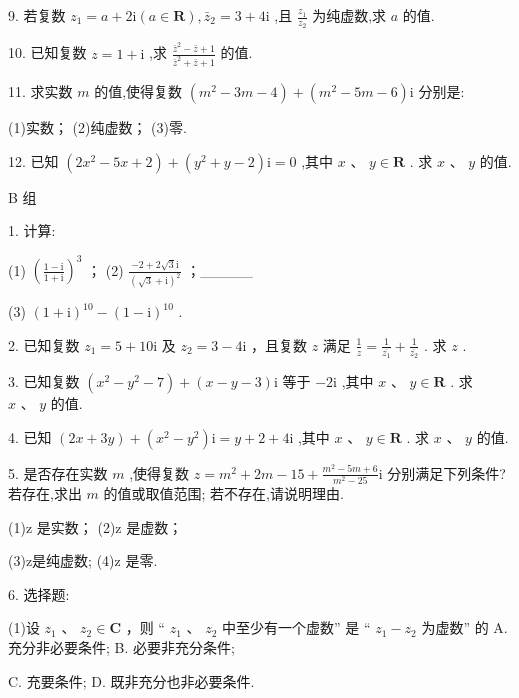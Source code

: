 \documentclass[10pt]{article}
\begin{document}
9. 若复数 \({z}_{1} = a + 2\mathrm{i}\left( {a \in  \mathbf{R}}\right) ,{\bar{z}}_{2} = 3 + 4\mathrm{i}\) ,且 \(\frac{{z}_{1}}{{z}_{2}}\) 为纯虚数,求 \(a\) 的值.

10. 已知复数 \(z = 1 + \mathrm{i}\) ,求 \(\frac{{\bar{z}}^{2} - \bar{z} + 1}{{\bar{z}}^{2} + \bar{z} + 1}\) 的值.

11. 求实数 \(m\) 的值,使得复数 \(\left( {{m}^{2} - {3m} - 4}\right)  + \left( {{m}^{2} - {5m} - 6}\right) \mathrm{i}\) 分别是:

(1)实数； (2)纯虚数； (3)零.

12. 已知 \(\left( {2{x}^{2} - {5x} + 2}\right)  + \left( {{y}^{2} + y - 2}\right) \mathrm{i} = 0\) ,其中 \(x\text{ 、 }y \in  \mathbf{R}\) . 求 \(x\text{ 、 }y\) 的值.

B 组

1. 计算:

(1) \({\left( \frac{1 - \mathrm{i}}{1 + \mathrm{i}}\right) }^{3}\) ； (2) \(\frac{-2 + 2\sqrt{3}\mathrm{i}}{{\left( \sqrt{3} + \mathrm{i}\right) }^{2}}\) ；\_\_\_\_\_

(3) \({\left( 1 + \mathrm{i}\right) }^{10} - {\left( 1 - \mathrm{i}\right) }^{10}\) .

2. 已知复数 \({z}_{1} = 5 + {10}\mathrm{i}\) 及 \({z}_{2} = 3 - 4\mathrm{i}\) ，且复数 \(z\) 满足 \(\frac{1}{z} = \frac{1}{\overline{{z}_{1}}} + \frac{1}{\overline{{z}_{2}}}\) . 求 \(z\) .

3. 已知复数 \(\left( {{x}^{2} - {y}^{2} - 7}\right)  + \left( {x - y - 3}\right) \mathrm{i}\) 等于 \(- 2\mathrm{i}\) ,其中 \(x\text{ 、 }y \in  \mathbf{R}\) . 求 \(x\text{ 、 }y\) 的值.

4. 已知 \(\left( {{2x} + {3y}}\right)  + \left( {{x}^{2} - {y}^{2}}\right) \mathrm{i} = y + 2 + 4\mathrm{i}\) ,其中 \(x\text{ 、 }y \in  \mathbf{R}\) . 求 \(x\text{ 、 }y\) 的值.

5. 是否存在实数 \(m\) ,使得复数 \(z = {m}^{2} + {2m} - {15} + \frac{{m}^{2} - {5m} + 6}{{m}^{2} - {25}}\mathrm{i}\) 分别满足下列条件? 若存在,求出 \(m\) 的值或取值范围; 若不存在,请说明理由.

(1)z 是实数； (2)z 是虚数；

(3)z是纯虚数; (4)z 是零.

6. 选择题:

(1)设 \({z}_{1}\text{ 、 }{z}_{2} \in  \mathbf{C}\) ，则 “ \({z}_{1}\text{ 、 }{z}_{2}\) 中至少有一个虚数” 是 “ \({z}_{1} - {z}_{2}\) 为虚数” 的 A. 充分非必要条件; B. 必要非充分条件;

C. 充要条件; D. 既非充分也非必要条件.
\end{document}
